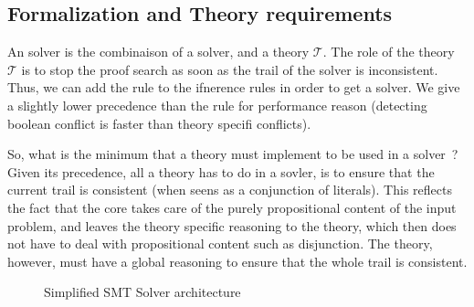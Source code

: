 \documentclass{article}
\begin{document}
\subsection{Formalization and Theory requirements}

An \smt{} solver is the combinaison of a \sat{} solver, and a theory $\mathcal{T}$.
The role of the theory $\mathcal{T}$ is to stop the proof search as soon as the trail
of the \sat{} solver is inconsistent. Thus, we can add the  rule
to the \sat{} ifnerence rules in order to get a \smt{} solver. We give a slightly lower
precedence than the  rule for performance reason (detecting boolean
conflict is faster than theory specifi conflicts).

So, what is the minimum that a theory must implement to be used in a \smt{} solver~?
Given its precedence, all a theory has to do in a \smt{} sovler, is to ensure that
the current trail is consistent (when seens as a conjunction of literals). This
reflects the fact that the \sat{} core takes care of the purely propositional content
of the input problem, and leaves the theory specific reasoning to the theory, which
then does not have to deal with propositional content such as disjunction. The theory,
however, must have a global reasoning to ensure that the whole trail is consistent.

\begin{figure}
  \begin{center}
  \end{center}
  \caption{Simplified SMT Solver architecture}\label{fig:smt_flow}
\end{figure}
\end{document}

